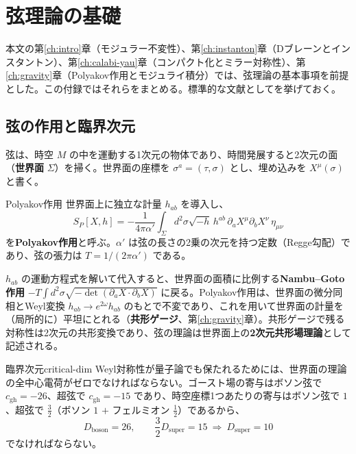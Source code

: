 \documentclass[uplatex, dvipdfmx, book]{jsbook}
\let\origsection\section
\let\origsubsection\subsection
\let\origsubsubsection\subsubsection
\newcommand{\chapter}{\origsection}
\renewcommand{\section}{\origsubsection}
\renewcommand{\subsection}{\origsubsubsection}
\renewcommand{\subsubsection}{\paragraph}
\begin{document}
\chapter{弦理論の基礎}
\label{app:string}

本文の第\ref{ch:intro}章（モジュラー不変性）、第\ref{ch:instanton}章（Dブレーンとインスタントン）、第\ref{ch:calabi-yau}章（コンパクト化とミラー対称性）、第\ref{ch:gravity}章（Polyakov作用とモジュライ積分）では、弦理論の基本事項を前提とした。この付録ではそれらをまとめる。標準的な文献として\cite{polchinskistringtheoryvolume12005,polchinskistringtheoryvolume2005}を挙げておく。

\section{弦の作用と臨界次元}

弦は、時空 $M$ の中を運動する1次元の物体であり、時間発展すると2次元の面（\textbf{世界面} $\Sigma$）を掃く。世界面の座標を $\sigma^a = (\tau, \sigma)$ とし、埋め込みを $X^\mu(\sigma)$ と書く。

\begin{mydef}{Polyakov作用}{}
世界面上に独立な計量 $h_{ab}$ を導入し、
\begin{equation*}
    S_P[X, h] = -\frac{1}{4\pi\alpha'}\int_\Sigma d^2\sigma \sqrt{-h}\, h^{ab}\, \partial_a X^\mu \partial_b X^\nu\, \eta_{\mu\nu}
\end{equation*}
を\textbf{Polyakov作用}と呼ぶ。$\alpha'$ は弦の長さの2乗の次元を持つ定数（Regge勾配）であり、弦の張力は $T = 1/(2\pi\alpha')$ である。
\end{mydef}

$h_{ab}$ の運動方程式を解いて代入すると、世界面の面積に比例する\textbf{Nambu--Goto作用} $-T\int d^2\sigma\sqrt{-\det(\partial_aX\cdot\partial_bX)}$ に戻る。Polyakov作用は、世界面の微分同相とWeyl変換 $h_{ab} \to e^{2\omega}h_{ab}$ のもとで不変であり、これを用いて世界面の計量を（局所的に）平坦にとれる（\textbf{共形ゲージ}、第\ref{ch:gravity}章）。共形ゲージで残る対称性は2次元の共形変換であり、弦の理論は世界面上の\textbf{2次元共形場理論}として記述される。

\begin{myprop}{臨界次元}{critical-dim}
Weyl対称性が量子論でも保たれるためには、世界面の理論の全中心電荷がゼロでなければならない。ゴースト場の寄与はボソン弦で $c_{\text{gh}} = -26$、超弦で $c_{\text{gh}} = -15$ であり、時空座標1つあたりの寄与はボソン弦で $1$、超弦で $\frac{3}{2}$（ボソン $1$ $+$ フェルミオン $\frac{1}{2}$）であるから、
\begin{equation*}
    D_{\text{boson}} = 26, \qquad \frac{3}{2}D_{\text{super}} = 15 \ \Rightarrow\ D_{\text{super}} = 10
\end{equation*}
でなければならない。
\end{myprop}
\end{document}
